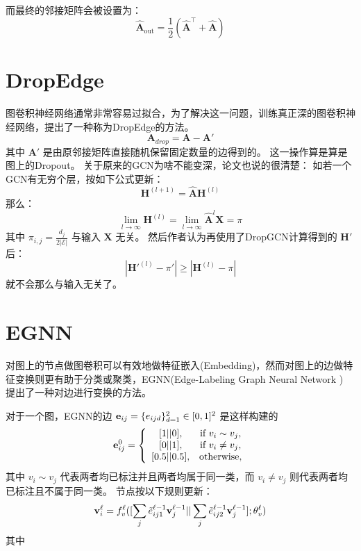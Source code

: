 \documentclass[color=gray,base=hide,cn]{elegantbook}
\begin{document}
而最终的邻接矩阵会被设置为：
\begin{equation}
    \mathbf{\hat{A}}_\text{out} = \frac{1}{2} \left(\mathbf{\hat{A}}^\top + \mathbf{\hat{A}} \right)
\end{equation}

\section{DropEdge}
图卷积神经网络通常非常容易过拟合，为了解决这一问题，训练真正深的图卷积神经网络，\cite{Rong2019TheTD}提出了一种称为DropEdge的方法。
\begin{equation}
    \mathbf{A}_{drop} = \mathbf{A}-\mathbf{A}'
\end{equation}
其中 $\mathbf{A}'$ 是由原邻接矩阵直接随机保留固定数量的边得到的。
这一操作算是算是图上的Dropout。
关于原来的GCN为啥不能变深，论文也说的很清楚：
如若一个GCN有无穷个层，按如下公式更新：
\begin{equation}
    \mathbf{H}^{(l+1)} = \hat{\mathbf{A}}\mathbf{H}^{(l)}
\end{equation}
那么：
\begin{equation}
    \lim_{l \rightarrow \infty} \mathbf{H}^{(l)} = \lim_{l \rightarrow \infty} \hat{\mathbf{A}}^l\mathbf{X}=\pi
\end{equation}
其中 $\pi_{i,j}=\frac{d_j}{2|\mathcal{E}|}$ 与输入 $\mathbf{X}$ 无关。
然后作者认为再使用了DropGCN计算得到的 $\mathbf{H}'$ 后：
\begin{equation}
    |\mathbf{H}'^{(l)} - \pi'| \ge |\mathbf{H}^{(l)} - \pi|
\end{equation}
就不会那么与输入无关了。

\section{EGNN}
对图上的节点做图卷积可以有效地做特征嵌入(Embedding)，然而对图上的边做特征变换则更有助于分类或聚类，EGNN(Edge-Labeling Graph Neural Network \cite{kim2019edgelabeling}) 提出了一种对边进行变换的方法。

对于一个图，EGNN的边 ${\bf e}_{ij} = \{e_{ijd}\}_{d=1}^{2} \in [0, 1]^2$ 是这样构建的
\begin{equation}
    {\bf e}_{ij}^0 = \left\{\begin{array}{cc} {[1||0]},& \mbox{if} ~ v_i \sim v_j, \\ {[0||1]},&  \mbox{if} ~ v_i \neq v_j, \\ {[0.5||0.5]},& \mbox{otherwise}, \end{array} \right.
\end{equation}
其中 $v_i \sim v_j$ 代表两者均已标注并且两者均属于同一类，而 $v_i \neq v_j$ 则代表两者均已标注且不属于同一类。
节点按以下规则更新：
\begin{equation}
    {\bf v}_{i}^{\ell} = f_v^{\ell}([\sum_{j} {\tilde e}_{ij1}^{\ell-1}{\bf v}_j^{\ell-1}||\sum_{j} {\tilde e}_{ij2}^{\ell-1}{\bf v}_j^{\ell-1}];\theta_v^{\ell})
\end{equation}
其中
\end{document}
